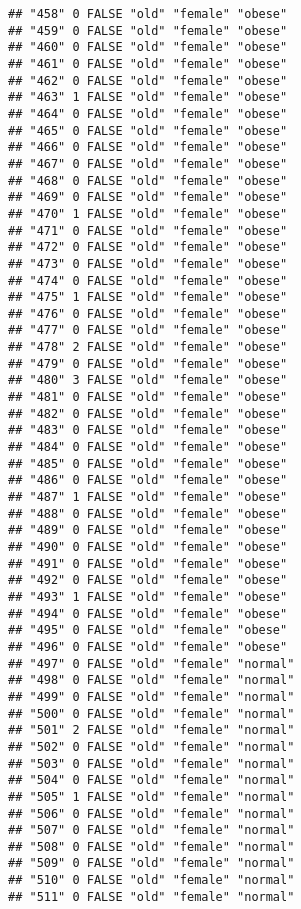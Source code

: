 \documentclass[]{article}
\begin{document}
\begin{verbatim}
## "458" 0 FALSE "old" "female" "obese"
## "459" 0 FALSE "old" "female" "obese"
## "460" 0 FALSE "old" "female" "obese"
## "461" 0 FALSE "old" "female" "obese"
## "462" 0 FALSE "old" "female" "obese"
## "463" 1 FALSE "old" "female" "obese"
## "464" 0 FALSE "old" "female" "obese"
## "465" 0 FALSE "old" "female" "obese"
## "466" 0 FALSE "old" "female" "obese"
## "467" 0 FALSE "old" "female" "obese"
## "468" 0 FALSE "old" "female" "obese"
## "469" 0 FALSE "old" "female" "obese"
## "470" 1 FALSE "old" "female" "obese"
## "471" 0 FALSE "old" "female" "obese"
## "472" 0 FALSE "old" "female" "obese"
## "473" 0 FALSE "old" "female" "obese"
## "474" 0 FALSE "old" "female" "obese"
## "475" 1 FALSE "old" "female" "obese"
## "476" 0 FALSE "old" "female" "obese"
## "477" 0 FALSE "old" "female" "obese"
## "478" 2 FALSE "old" "female" "obese"
## "479" 0 FALSE "old" "female" "obese"
## "480" 3 FALSE "old" "female" "obese"
## "481" 0 FALSE "old" "female" "obese"
## "482" 0 FALSE "old" "female" "obese"
## "483" 0 FALSE "old" "female" "obese"
## "484" 0 FALSE "old" "female" "obese"
## "485" 0 FALSE "old" "female" "obese"
## "486" 0 FALSE "old" "female" "obese"
## "487" 1 FALSE "old" "female" "obese"
## "488" 0 FALSE "old" "female" "obese"
## "489" 0 FALSE "old" "female" "obese"
## "490" 0 FALSE "old" "female" "obese"
## "491" 0 FALSE "old" "female" "obese"
## "492" 0 FALSE "old" "female" "obese"
## "493" 1 FALSE "old" "female" "obese"
## "494" 0 FALSE "old" "female" "obese"
## "495" 0 FALSE "old" "female" "obese"
## "496" 0 FALSE "old" "female" "obese"
## "497" 0 FALSE "old" "female" "normal"
## "498" 0 FALSE "old" "female" "normal"
## "499" 0 FALSE "old" "female" "normal"
## "500" 0 FALSE "old" "female" "normal"
## "501" 2 FALSE "old" "female" "normal"
## "502" 0 FALSE "old" "female" "normal"
## "503" 0 FALSE "old" "female" "normal"
## "504" 0 FALSE "old" "female" "normal"
## "505" 1 FALSE "old" "female" "normal"
## "506" 0 FALSE "old" "female" "normal"
## "507" 0 FALSE "old" "female" "normal"
## "508" 0 FALSE "old" "female" "normal"
## "509" 0 FALSE "old" "female" "normal"
## "510" 0 FALSE "old" "female" "normal"
## "511" 0 FALSE "old" "female" "normal"
\end{verbatim}
\end{document}

